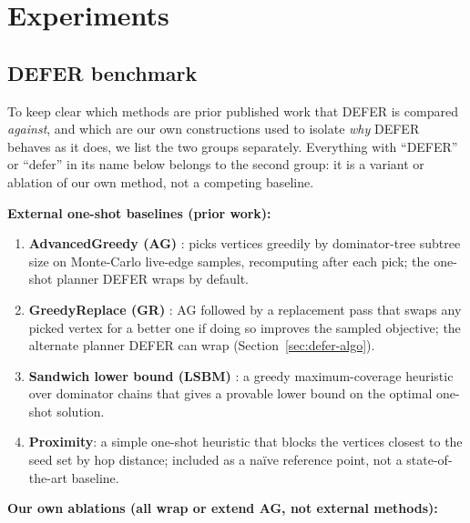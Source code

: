 \documentclass[ijoc,sglanonrev]{informs4}
\begin{document}
\section{Experiments}\label{sec:experiments}

\subsection{DEFER benchmark}\label{sec:defer-experiments}

To keep clear which methods are prior published work that DEFER is
compared \emph{against}, and which are our own constructions used to
isolate \emph{why} DEFER behaves as it does, we list the two groups
separately. Everything with ``DEFER'' or ``defer'' in its name below
belongs to the second group: it is a variant or ablation of our own
method, not a competing baseline.

\noindent\textbf{External one-shot baselines (prior work):}

\begin{enumerate}
\item \textbf{AdvancedGreedy (AG)} \citep{xie2024}: picks vertices
  greedily by dominator-tree subtree size on Monte-Carlo live-edge
  samples, recomputing after each pick; the one-shot planner DEFER wraps
  by default.
\item \textbf{GreedyReplace (GR)} \citep{xie2024}: AG followed by a
  replacement pass that swaps any picked vertex for a better one if doing
  so improves the sampled objective; the alternate planner DEFER can wrap
  (Section~\ref{sec:defer-algo}).
\item \textbf{Sandwich lower bound (LSBM)} \citep{wang2024sandwich}: a
  greedy maximum-coverage heuristic over dominator chains that gives a
  provable lower bound on the optimal one-shot solution.
\item \textbf{Proximity}: a simple one-shot heuristic that blocks the
  vertices closest to the seed set by hop distance; included as a
  na\"ive reference point, not a state-of-the-art baseline.
\end{enumerate}

\noindent\textbf{Our own ablations (all wrap or extend AG, not external
methods):}
\end{document}
